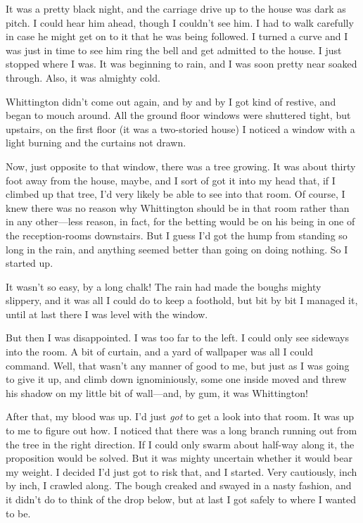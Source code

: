 It was a pretty black night, and the carriage drive up to the house was dark as pitch. I could hear him ahead, though I couldn't see him. I had to walk carefully in case he might get on to it that he was being followed. I turned a curve and I was just in time to see him ring the bell and get admitted to the house. I just stopped where I was. It was beginning to rain, and I was soon pretty near soaked through. Also, it was almighty cold.

Whittington didn't come out again, and by and by I got kind of restive, and began to mouch around. All the ground floor windows were shuttered tight, but upstairs, on the first floor (it was a two-storied house) I noticed a window with a light burning and the curtains not drawn.

Now, just opposite to that window, there was a tree growing. It was about thirty foot away from the house, maybe, and I sort of got it into my head that, if I climbed up that tree, I'd very likely be able to see into that room. Of course, I knew there was no reason why Whittington should be in that room rather than in any other—less reason, in fact, for the betting would be on his being in one of the reception-rooms downstairs. But I guess I'd got the hump from standing so long in the rain, and anything seemed better than going on doing nothing. So I started up.

It wasn't so easy, by a long chalk! The rain had made the boughs mighty slippery, and it was all I could do to keep a foothold, but bit by bit I managed it, until at last there I was level with the window.

But then I was disappointed. I was too far to the left. I could only see sideways into the room. A bit of curtain, and a yard of wallpaper was all I could command. Well, that wasn't any manner of good to me, but just as I was going to give it up, and climb down ignominiously, some one inside moved and threw his shadow on my little bit of wall—and, by gum, it was Whittington!

After that, my blood was up. I'd just \emph{got} to get a look into that room. It was up to me to figure out how. I noticed that there was a long branch running out from the tree in the right direction. If I could only swarm about half-way along it, the proposition would be solved. But it was mighty uncertain whether it would bear my weight. I decided I'd just got to risk that, and I started. Very cautiously, inch by inch, I crawled along. The bough creaked and swayed in a nasty fashion, and it didn't do to think of the drop below, but at last I got safely to where I wanted to be.

